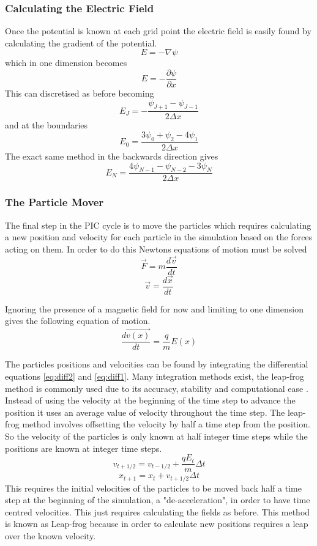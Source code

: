 \documentclass[12pt]{article}
\def\be{\begin{equation}}
\def\ee{\end{equation}}
\begin{document}
\subsubsection{Calculating the Electric Field}
Once the potential is known at each grid point the electric field is easily found by calculating the gradient of the potential.
\be 
E = - \nabla \psi
\ee 
which in one dimension becomes
\be 
E = - \frac{\partial \psi}{\partial x}
\label{eq:electricfield}
\ee
This can discretised as before becoming
\be 
E_J = - \frac{\psi_{J+1} - \psi_{J-1}}{2 \Delta x}
\ee 
and at the boundaries 
\be
E_0 = \frac{3\psi_0 + \psi_2 - 4\psi_1}{2\Delta x}
\ee 
The exact same method in the backwards direction gives 
\be 
E_N = \frac{4\psi_{N-1} - \psi_{N-2} - 3\psi_N}{2\Delta x}
\ee 

\subsubsection{The Particle Mover}
The final step in the PIC cycle is to move the particles which requires calculating a new position and velocity for each particle in the simulation based on the forces acting on them. In order to do this Newtons equations of motion must be solved 
\be 
\vec{F}  = m \frac{d \vec{v}}{d t}
\ee 
\be 
\vec{v} = \frac{d \vec{x}}{d t}
\label{eq:diff2}
\ee 

Ignoring the presence of a magnetic field for now and limiting to one dimension gives the following equation of motion.
\be 
\frac{d \vec{v(x)}}{d t} = \frac{q}{m} E(x)
\label{eq:diff1}
\ee

The particles positions and velocities can be found by integrating the differential equations \eqref{eq:diff2} and \eqref{eq:diff1}. Many integration methods exist, the leap-frog method is commonly used due to its accuracy, stability and computational ease \cite{second_order}. Instead of using the velocity at the beginning of the time step to advance the position it uses an average value of velocity throughout the time step. The leap-frog method involves offsetting the velocity by half a time step from the position. So the velocity of the particles is only known at half integer time steps while the positions are known at integer time steps. 
\be 
v_{t+1/2} = v_{t- 1/2} + \frac{qE_t}{m} \Delta t
\ee
\be 
x_{t+1} = x_{t} + v_{t+1/2} \Delta t
\ee 
This requires the initial velocities of the particles to be moved back half a time step at the beginning of the simulation, a "de-acceleration", in order to have time centred velocities. This just requires calculating the fields as before. This method is known as Leap-frog because in order to calculate new positions requires a leap over the known velocity. 
\end{document}
